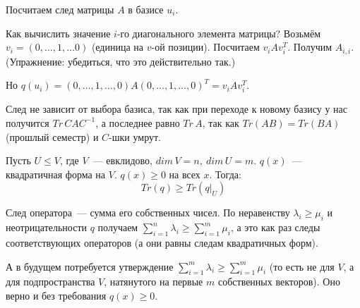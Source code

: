 \proofname

Посчитаем след матрицы $A$ в базисе $u_i$.

Как вычислить значение $i$-го диагонального элемента матрицы? Возьмём $v_i=(0,\ldots,1,\ldots 0)$ (единица на $v$-ой позиции). Посчитаем $v_iAv_i^T$. Получим $A_{i, i}$. (Упражнение: убедиться, что это действительно так.)

Но $q(u_i) = (0,\ldots,1,\ldots,0)A(0,\ldots,1,\ldots,0)^T = v_iAv_i^T$.

След не зависит от выбора базиса, так как при переходе к новому базису у нас получится $Tr\,CAC^{-1}$, а последнее равно $Tr\,A$, так как $Tr(AB)=Tr(BA)$ (прошлый семестр) и $C$-шки умрут.


Пусть $U\le V$, где $V$~--- евклидово, $dim\,V = n,\ dim\,U = m$. $q(x)$~--- квадратичная форма на $V$. $q(x)\ge 0$ на всех $x$. Тогда:
$$
Tr(q)\ge Tr(q|_U)
$$

\proofname

След оператора~--- сумма его собственных чисел. По неравенству $\lambda_i\ge\mu_i$ и неотрицательности $q$ получаем $\sum\limits_{i=1}^n \lambda_i \ge \sum\limits_{i=1}^m \mu_i$, а это как раз следы соответствующих операторов (а они равны следам квадратичных форм).

\rem А в будущем потребуется утверждение $\sum\limits_{i = 1}^m \lambda_i \ge \sum\limits_{i = 1}^m \mu_i$ (то есть не для $V$, а для подпространства $V$, натянутого на первые $m$ собственных векторов). Оно верно и без требования $q(x)\ge 0$.